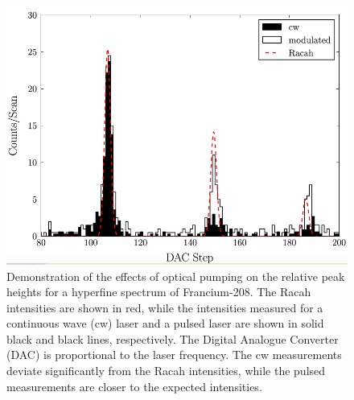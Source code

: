 \begin{figure}[h]
\includegraphics[width=\textwidth]{Graphics/francium.png}
\caption[Demonstration of the effects of optical pumping on the relative peak heights for a hyperfine spectrum of Francium-208.]{\small Demonstration of the effects of optical pumping on the relative peak heights for a hyperfine spectrum of Francium-208. The Racah intensities are shown in red, while the intensities measured for a continuous wave (cw) laser and a pulsed laser are shown in solid black and black lines, respectively. The Digital Analogue Converter (DAC) is proportional to the laser frequency. The cw measurements deviate significantly from the Racah intensities, while the pulsed measurements are closer to the expected intensities.\cite{CFBS}}
\label{OP_francium}
\end{figure}

